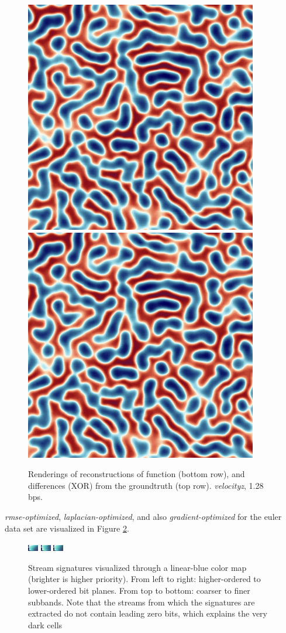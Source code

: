 \begin{figure}
	{\includegraphics[width=0.24\linewidth]{img/laplacian/curr_func2-laplacian-signature.png}}
	{\includegraphics[width=0.24\linewidth]{img/laplacian/curr_func3-laplacian-optimized.png}}
	\caption{Renderings of reconstructions of function (bottom row), and differences (XOR) from the groundtruth (top row). \emph{velocityz}, 1.28 bps.}
  \label{fig:gradient-rendering}
\end{figure}

\emph{rmse-optimized}, \emph{laplacian-optimized}, and also \emph{gradient-optimized} for the euler
data set are visualized in Figure \ref{fig:signature-comparison}. 

\begin{figure}
	\centering
	{\includegraphics[width=0.32\linewidth]{img/gradient-laplacian/SIG-GREEDY-(rmse).png}}
	{\includegraphics[width=0.32\linewidth]{img/gradient-laplacian/SIG-GREEDY-(laplacian).png}}
	{\includegraphics[width=0.32\linewidth]{img/gradient-laplacian/SIG-GREEDY-(gradient).png}}
	\caption{Stream signatures visualized through a linear-blue color map (brighter is higher
	priority). From left to right: higher-ordered to lower-ordered bit planes. From top to bottom:
	coarser to finer subbands. Note that the streams from which the signatures are extracted do not
	contain leading zero bits, which explains the very dark cells }
	\label{fig:signature-comparison}
\end{figure}

